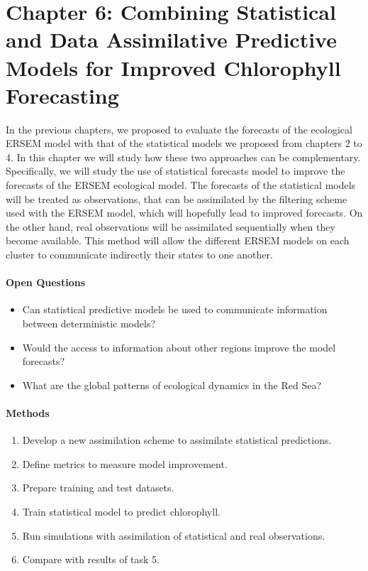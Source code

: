 \section{Chapter 6: Combining Statistical and Data Assimilative Predictive
Models for Improved Chlorophyll Forecasting}

In the previous chapters, we proposed to evaluate the forecasts of the
ecological ERSEM model with that of the statistical models we proposed from
chapters 2 to 4. In this chapter we will study how these two approaches can be
complementary. Specifically, we will study the use of statistical forecasts
model to improve the forecasts of the ERSEM ecological model. The forecasts of
the statistical models will be treated as observations, that can be assimilated
by the filtering scheme used with the ERSEM model, which will hopefully lead to
improved forecasts. On the other hand, real observations will be assimilated
sequentially when they become available. This method will allow the different
ERSEM models on each cluster to communicate indirectly their states to one
another. 

\paragraph{Open Questions}

\begin{itemize}

\item Can statistical predictive models be used to communicate information
between deterministic models?

\item Would the access to information about other regions improve the model
forecasts?

\item What are the global patterns of ecological dynamics in the Red Sea?

\end{itemize}

\paragraph{Methods}

\begin{enumerate}

\item Develop a new assimilation scheme to assimilate statistical predictions.

\item Define metrics to measure model improvement.

\item Prepare training and test datasets.

\item Train statistical model to predict chlorophyll.

\item Run simulations with assimilation of statistical and real observations.

\item Compare with results of task 5.

\end{enumerate}

